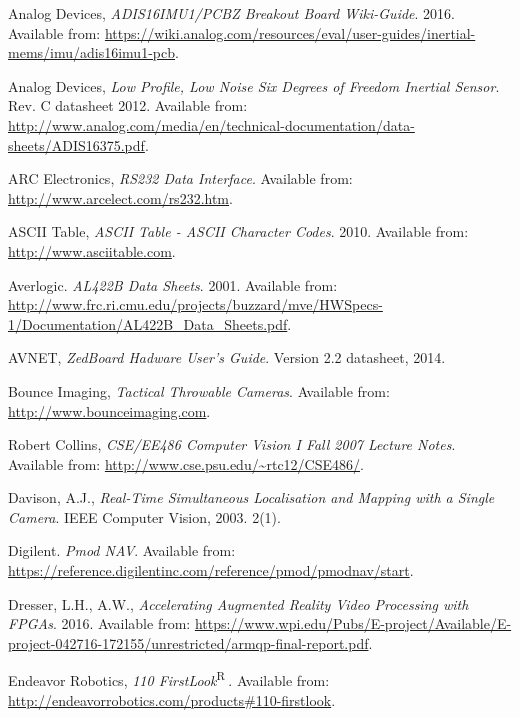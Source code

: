 \begin{thebibliography}{9}

Analog Devices, \textit{ADIS16IMU1/PCBZ Breakout Board Wiki-Guide}. 2016. Available from: \url{https://wiki.analog.com/resources/eval/user-guides/inertial-mems/imu/adis16imu1-pcb}.

Analog Devices, \textit{Low Profile, Low Noise Six Degrees of Freedom Inertial Sensor}. Rev. C datasheet 2012. Available from: \url{http://www.analog.com/media/en/technical-documentation/data-sheets/ADIS16375.pdf}.

ARC Electronics, \textit{RS232 Data Interface}. Available from: \url{http://www.arcelect.com/rs232.htm}.

ASCII Table, \textit{ASCII Table - ASCII Character Codes}. 2010. Available from: \url{http://www.asciitable.com}.

Averlogic.
\textit{AL422B Data Sheets}. 2001.
Available from: \url{http://www.frc.ri.cmu.edu/projects/buzzard/mve/HWSpecs-1/Documentation/AL422B_Data_Sheets.pdf}.

AVNET, \textit{ZedBoard Hadware User's Guide}. Version 2.2 datasheet, 2014.

Bounce Imaging, \textit{Tactical Throwable Cameras}. Available from: \url{http://www.bounceimaging.com}.

Robert Collins, \textit{CSE/EE486 Computer Vision I Fall 2007 Lecture Notes}. Available from: \url{http://www.cse.psu.edu/~rtc12/CSE486/}.

Davison, A.J.,
\textit{Real-Time Simultaneous Localisation and Mapping with a Single Camera}. 
IEEE Computer Vision, 2003. 2(1).

Digilent. \textit{Pmod NAV}. Available from: \url{https://reference.digilentinc.com/reference/pmod/pmodnav/start}.

Dresser, L.H., A.W., \textit{Accelerating Augmented Reality Video Processing with FPGAs}. 2016. Available from: \url{https://www.wpi.edu/Pubs/E-project/Available/E-project-042716-172155/unrestricted/armqp-final-report.pdf}.

Endeavor Robotics, \textit{110 FirstLook}\textsuperscript{\textcircled{R}}. Available from: \url{http://endeavorrobotics.com/products#110-firstlook}.


\end{thebibliography}
